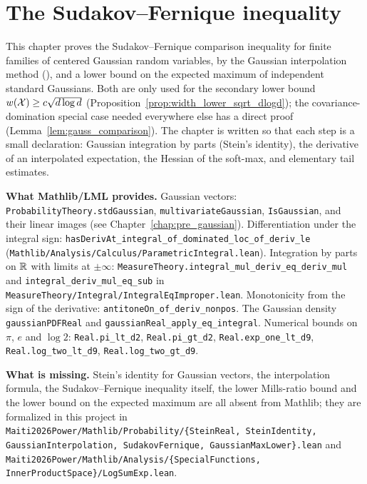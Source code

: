 \chapter{The Sudakov--Fernique inequality}
\label{chap:pre_sudakov}

This chapter proves the Sudakov--Fernique comparison inequality for finite families of
centered Gaussian random variables, by the Gaussian interpolation method
(\cite[Theorem~7.2.11]{vershynin2018high}), and a lower bound on the expected maximum of
independent standard Gaussians. Both are only used for the secondary lower bound
$w(\mathcal{X}) \ge c\sqrt{d\log d}$ (Proposition~\ref{prop:width_lower_sqrt_dlogd}); the
covariance-domination special case needed everywhere else has a direct proof
(Lemma~\ref{lem:gauss_comparison}). The chapter is written so that each step is a small
declaration: Gaussian integration by parts (Stein's identity), the derivative of an
interpolated expectation, the Hessian of the soft-max, and elementary tail estimates.

\textbf{What Mathlib/LML provides.} Gaussian vectors: \texttt{ProbabilityTheory.stdGaussian},
\texttt{multivariateGaussian}, \texttt{IsGaussian}, and their linear images (see
Chapter~\ref{chap:pre_gaussian}). Differentiation under the integral sign:
\texttt{hasDerivAt\_integral\_of\_dominated\_loc\_of\_deriv\_le}
(\texttt{Mathlib/Analysis/Calculus/ParametricIntegral.lean}). Integration by parts on $\mathbb{R}$ with
limits at $\pm\infty$: \texttt{MeasureTheory.integral\_mul\_deriv\_eq\_deriv\_mul} and
\texttt{integral\_deriv\_mul\_eq\_sub} in \texttt{MeasureTheory/Integral/IntegralEqImproper.lean}.
Monotonicity from the sign of the derivative: \texttt{antitoneOn\_of\_deriv\_nonpos}. The
Gaussian density \texttt{gaussianPDFReal} and \texttt{gaussianReal\_apply\_eq\_integral}.
Numerical bounds on $\pi$, $e$ and $\log 2$: \texttt{Real.pi\_lt\_d2}, \texttt{Real.pi\_gt\_d2},
\texttt{Real.exp\_one\_lt\_d9}, \texttt{Real.log\_two\_lt\_d9}, \texttt{Real.log\_two\_gt\_d9}.

\textbf{What is missing.} Stein's identity for Gaussian vectors, the interpolation formula, the
Sudakov--Fernique inequality itself, the lower Mills-ratio bound and the lower bound on the
expected maximum are all absent from Mathlib; they are formalized in this project in
\texttt{Maiti2026Power/Mathlib/Probability/\{SteinReal, SteinIdentity, GaussianInterpolation,
SudakovFernique, GaussianMaxLower\}.lean} and
\texttt{Maiti2026Power/Mathlib/Analysis/\{SpecialFunctions, InnerProductSpace\}/LogSumExp.lean}.

